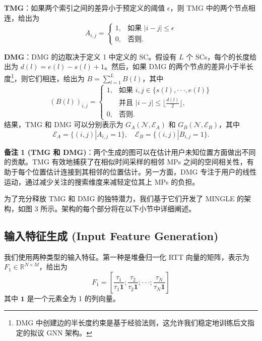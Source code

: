 \documentclass[journal]{IEEEtran}
\begin{document}
\textbf{TMG}：如果两个索引之间的差异小于预定义的阈值 $\epsilon$，则 TMG 中的两个节点相连，给出为
\begin{equation}
A_{i,j}=\begin{cases}1,& \text{如果 } |i-j|\le\epsilon\\ 0,& \text{否则}.\end{cases} \label{eq:10}
\end{equation}

\textbf{DMG}：DMG 的边取决于定义 1 中定义的 SC。假设有 $L$ 个 SCs，每个的长度给出为 $d(l)=e(l)-s(l)+1$。然后，如果 DMG 的两个节点的差异小于半长度\footnote{DMG 中创建边的半长度约束是基于经验法则，这允许我们稳定地训练后文指定的拟议 GNN 架构。}，则它们相连，给出为 $B=\sum_{l=1}^{L}B(l)$，其中
\begin{equation}
(B(l))_{i,j}=\begin{cases}1,& \text{如果 } i,j\in\{s(l),\cdot\cdot\cdot,e(l)\}\\ & \text{并且 } |i-j|\le\lfloor\frac{d(l)}{2}\rfloor,\\ 0,& \text{否则}.\end{cases} \label{eq:11}
\end{equation}
结果，TMG 和 DMG 可以分别表示为 $G_{A}(\mathcal{N},\mathcal{E}_{A})$ 和 $G_{B}(\mathcal{N},\mathcal{E}_{B})$，其中
\begin{equation}
\mathcal{E}_{A}=\{(i,j)|A_{i,j}=1\}, \quad \mathcal{E}_{B}=\{(i,j)|B_{i,j}=1\}. \label{eq:12}
\end{equation}

\textbf{备注 1 (TMG 和 DMG)}：两个生成的图可以在估计用户未知位置方面做出不同的贡献。TMG 有效地捕获了在相似时间采样的相邻 MPs 之间的空间相关性，有助于每个位置估计连接到其相邻的位置估计。另一方面，DMG 专注于用户的线性运动，通过减少关注的搜索维度来减轻定位其上 MPs 的负担。

为了充分释放 TMG 和 DMG 的独特潜力，我们基于它们开发了 MINGLE 的架构，如图 3 所示。架构的每个部分将在以下小节中详细阐述。

\subsection{输入特征生成 (Input Feature Generation)}
我们使用两种类型的输入特征。第一种是堆叠归一化 RTT 向量的矩阵，表示为 $F_{1}\in\mathbb{R}^{N\times M}$，给出为
\begin{equation}
F_{1}=[\frac{\tau_{1}}{\tau_{1}\mathbf{1}};\frac{\tau_{2}}{\tau_{2}\mathbf{1}};\cdot\cdot\cdot;\frac{\tau_{N}}{\tau_{N}\mathbf{1}}] \label{eq:13}
\end{equation}
其中 $\mathbf{1}$ 是一个元素全为 1 的列向量。
\end{document}
